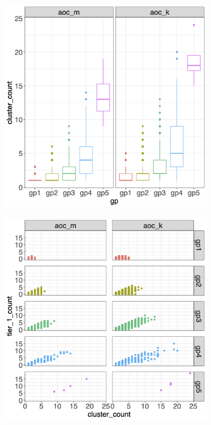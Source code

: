 \documentclass[12pt, oneside]{article}   	%
\begin{document}
\begin{figure}
\centering
\begin{subfigure}[t]{0.48\textwidth}
\centering
\includegraphics[width=\linewidth]{bl_group_cluster.png} 
\end{subfigure}
\hfill
\begin{subfigure}[t]{0.48\textwidth}
\centering
\includegraphics[width=\linewidth]{bl_cluster_tier.png} 

\end{subfigure}
\end{figure}
\end{document}
